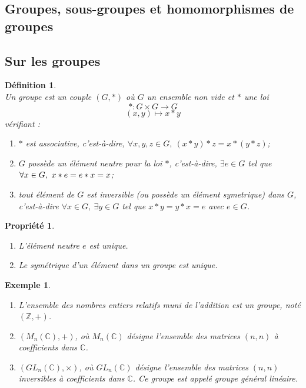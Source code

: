 \documentclass[a4paper, 14pt]{report}
\newtheorem{definition}{Définition}[section]
\newtheorem{example}{Exemple}[section]
\newtheorem{propriety}{Propriété}[section]
\begin{document}
\begin{onehalfspace}
{\section{Groupes, sous-groupes et homomorphismes de groupes}
\subsection{Sur les groupes}


\begin{definition} \cite{schaub1997} \\
Un groupe est un couple  $(G,*)$ où $G$ un ensemble non vide et $*$ une loi
	\[
	* : G \times G \longrightarrow G
	\]
	\[
	(x, y) \longmapsto x * y
	\]
	vérifiant :
	\begin{enumerate} [label=\roman*)]
		\item $*$ est associative, c'est-à-dire, \(\forall x, y, z \in G, \ (x * y) * z = x * (y * z)\);
		\item $G$ possède un élément neutre pour la loi $*$, c'est-à-dire, \(\exists e \in G\) tel que \(\forall x \in G, \\ \ x * e = e * x = x\);
		\item tout  élément de $G$ est inversible (ou possède un  élément symetrique) dans $G$, c'est-à-dire \(\forall x \in G, \ \exists y \in G\) tel que \(x * y = y * x = e\) avec $e \in G$.
	\end{enumerate}
\end{definition}

\begin{propriety} \cite{schaub1997}
	\begin{enumerate}[label=\roman*)]
		\item L'élément neutre \(e\) est unique.
		\item Le symétrique d'un élément dans un groupe est unique.
	\end{enumerate}
\end{propriety}

\begin{example} 
	\begin{enumerate} \
		\item L’ensemble des nombres entiers relatifs muni de l’addition est un groupe, noté \((\mathbb{Z}, +)\).
		\item \((M_n(\mathbb{C}), +)\), où \(M_n(\mathbb{C})\) désigne l’ensemble des matrices \((n, n)\) à coefficients dans \(\mathbb{C}\).
		\item \((GL_n(\mathbb{C}), \times)\), où \(GL_n(\mathbb{C})\) désigne l’ensemble des matrices \((n, n)\) inversibles à coefficients dans \(\mathbb{C}\). Ce groupe est appelé groupe général linéaire.
	\end{enumerate}
\end{example}


}
\end{onehalfspace}
\end{document}
